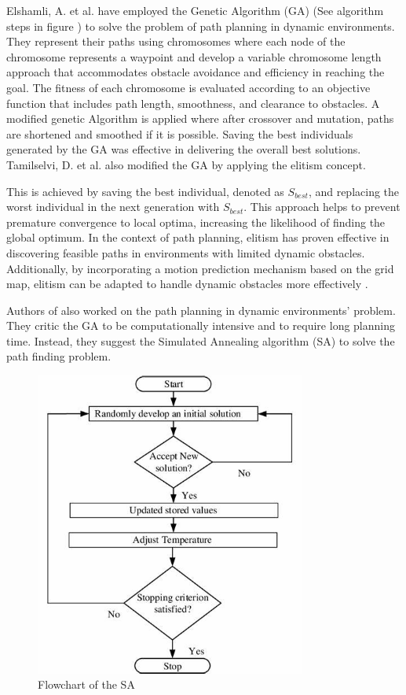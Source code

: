 Elshamli, A. et al. \cite{R17} have employed the Genetic Algorithm (GA) (See algorithm steps in figure ) to solve 
the problem of path planning in dynamic environments. They represent their paths using chromosomes where each node of the chromosome represents 
a waypoint and develop a variable chromosome length approach that accommodates obstacle avoidance and efficiency 
in reaching the goal. The fitness of each chromosome is evaluated according to an objective function that includes path length, smoothness, 
and clearance to obstacles. A modified genetic Algorithm is applied where after crossover and mutation, paths are 
shortened and smoothed if it is possible. Saving the best individuals generated by the GA was effective in delivering the overall best solutions.
Tamilselvi, D. et al. also modified the GA by applying the elitism concept. 

This is achieved by saving the best individual, denoted as \(S_{best}\), and replacing the worst individual in the 
next generation with \(S_{best}\). This approach helps to prevent premature convergence to local optima, increasing 
the likelihood of finding the global optimum. In the context of path planning, elitism has proven effective 
in discovering feasible paths in environments with limited dynamic obstacles. Additionally, by incorporating 
a motion prediction mechanism based on the grid map, elitism can be adapted to handle dynamic obstacles more 
effectively \cite{R38}.

Authors of \cite{R40} also worked on the path planning in dynamic environments' problem. They critic the GA to be computationally
intensive and to require long planning time. Instead, they suggest the Simulated Annealing algorithm (SA)
to solve the path finding problem. 

\begin{figure}[H]
    \centering
    \includegraphics[width=3.5in]{images/Chap1/SA.jpg}
    \caption{Flowchart of the SA \cite{R41}}
    \label{SA}
\end{figure}

